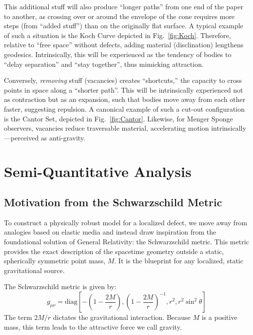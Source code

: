 \documentclass[%
  reprint,
  superscriptaddress,
  showpacs,
  showkeys,
  amsmath,amssymb,
  pra,
  longbibliography,
  floatfix,
  x11names
]{revtex4-2}
\begin{document}
This additional stuff will also produce  ``longer paths'' from one end of the paper to another,
as crossing over or around the envelope of the cone requires more steps (from ``added stuff'') than on the originally flat surface.
A typical example of such a situation is the Koch Curve depicted in Fig.~\ref{fig:Koch}.
Therefore, relative to ``free space'' without defects, adding material (disclination) lengthens geodesics.
Intrinsically, this will be experienced as the tendency of bodies to ``delay separation'' and ``stay together'', thus mimicking attraction.

Conversely, \emph{removing} stuff (vacancies) creates ``shortcuts,'' the capacity to cross points in space
along a ``shorter path''. This will be intrinsically experienced not as contraction but as an expansion,
such that bodies move away from each other faster, suggesting repulsion.
A canonical example of such a cut-out configuration is the Cantor Set, depicted in Fig.~\ref{fig:Cantor}.
Likewise, for Menger Sponge observers, vacancies reduce traversable material, accelerating motion intrinsically---perceived as anti-gravity.

\section{Semi-Quantitative Analysis}
\label{sec:quant}

\subsection{Motivation from the Schwarzschild Metric}

To construct a physically robust model for a localized defect, we move away from analogies based on elastic media and instead draw inspiration from the foundational solution of General Relativity: the Schwarzschild metric. This metric provides the exact description of the spacetime geometry outside a static, spherically symmetric point mass, $M$. It is the blueprint for any localized, static gravitational source.

The Schwarzschild metric is given by:
\begin{equation}
g_{\mu\nu} = \text{diag}\left[-\left(1 - \frac{2M}{r}\right), \left(1 - \frac{2M}{r}\right)^{-1}, r^2, r^2 \sin^2 \theta\right]
\label{eq:schwarzschild}
\end{equation}
The term $2M/r$ dictates the gravitational interaction. Because $M$ is a positive mass, this term leads to the attractive force we call gravity.
\end{document}
